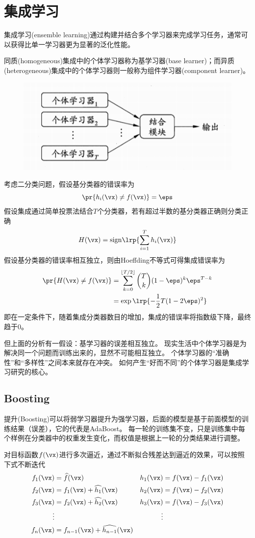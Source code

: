 
\section{集成学习}
集成学习(ensemble learning)通过构建并结合多个学习器来完成学习任务，通常可以获得比单一学习器更为显著的泛化性能。

同质(homogeneous)集成中的个体学习器称为基学习器(base learner)；而异质(heterogeneous)集成中的个体学习器则一般称为组件学习器(component learner)。
\begin{figure}[H]
\centering
\includegraphics[width=0.5\linewidth]{fig/ensemble-learning.png}
\end{figure}

考虑二分类问题，假设基分类器的错误率为
\[\pr{h_i(\vx)\ne f(\vx)}=\eps\]
假设集成通过简单投票法结合$T$个分类器，若有超过半数的基分类器正确则分类正确
\[H(\vx)=\mathrm{sign}\lrp{\sum_{i=1}^Th_i(\vx)}\]
假设基分类器的错误率相互独立，则由Hoeffding不等式可得集成错误率为
\[\begin{aligned}
\pr{H(\vx)\ne f(\vx)}
&=\sum_{k=0}^{\lfloor T/2\rfloor}\binom{T}{k}(1-\eps)^k\eps^{T-k}\\
&=\exp\lrp{-\frac{1}{2}T(1-2\eps)^2}
\end{aligned}\]
即在一定条件下，随着集成分类器数目的增加，集成的错误率将指数级下降，最终趋于$0$。

但上面的分析有一假设：基学习器的误差相互独立。
现实生活中个体学习器是为解决同一个问题而训练出来的，显然不可能相互独立。
个体学习器的“准确性”和“多样性”之间本来就存在冲突。
如何产生“好而不同”的个体学习器是集成学习研究的核心。

\subsection{Boosting}
提升(Boosting)可以将弱学习器提升为强学习器，后面的模型是基于前面模型的训练结果（误差），它的代表是AdaBoost。
每一轮的训练集不变，只是训练集中每个样例在分类器中的权重发生变化，而权值是根据上一轮的分类结果进行调整。

对目标函数$f(\vx)$进行多次逼近，通过不断拟合残差达到逼近的效果，可以按照下式不断迭代
\[\begin{aligned}
f_1(\vx) &=\widehat{f}(\vx)            & h_1(\vx) &=f(\vx)-f_1(\vx)\\
f_2(\vx) &=f_1(\vx)+\widehat{h_1}(\vx) & h_2(\vx) &=f(\vx)-f_2(\vx)\\
f_3(\vx) &=f_2(\vx)+\widehat{h_2}(\vx) & h_3(\vx) &=f(\vx)-f_3(\vx)\\
\vdots   &                             & \vdots \\
f_n(\vx) &=f_{n-1}(\vx)+\widehat{h_{n-1}}(\vx)
\end{aligned}\]

